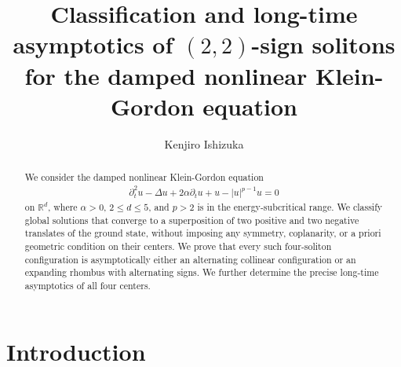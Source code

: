 \documentclass[reqno]{amsart}
\theoremstyle{plain}
\theoremstyle{definition}
\numberwithin{equation}{section}
\begin{document}


\title[]{Classification and long-time asymptotics of $(2,2)$-sign solitons for the damped nonlinear Klein-Gordon equation}
\author[K. Ishizuka]{Kenjiro Ishizuka
}
\address[K. Ishizuka]{Azabu Junior and Senior High School, Tokyo, Japan}
\date{}




\begin{abstract}
We consider the damped nonlinear Klein-Gordon equation
\begin{align*}
\partial_t^2u-\Delta u+2\alpha\partial_tu+u-|u|^{p-1}u=0
\end{align*}
on $\mathbb{R}^d$, where $\alpha>0$, $2\leq d\leq5$, and $p>2$ is in the energy-subcritical range. We classify global solutions that converge to a superposition of two positive and two negative translates of the ground state, without imposing any symmetry, coplanarity, or a priori geometric condition on their centers. We prove that every such four-soliton configuration is asymptotically either an alternating collinear configuration or an expanding rhombus with alternating signs. We further determine the precise long-time asymptotics of all four centers.
\end{abstract}

\maketitle




\tableofcontents



\section{Introduction}
\end{document}

